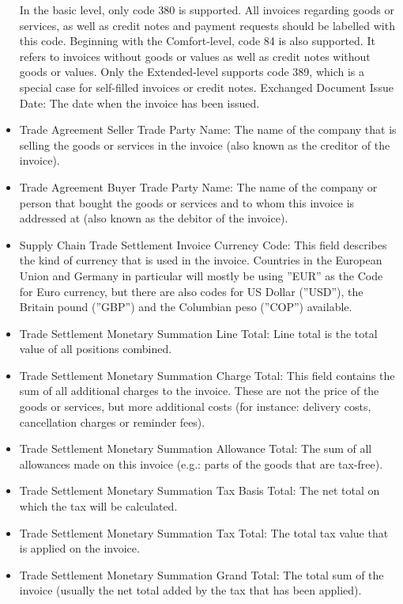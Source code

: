 \begin{itemize}
In the basic level, only code 380 is supported. All invoices regarding goods or services, as well as credit notes and payment requests should be labelled with this code.
Beginning with the Comfort-level, code 84 is also supported. It refers to invoices without goods or values as well as credit notes without goods or values.
Only the Extended-level supports code 389, which is a special case for self-filled invoices or credit notes.
Exchanged Document Issue Date: The date when the invoice has been issued.
	\item Trade Agreement Seller Trade Party Name: The name of the company that is selling the goods or services in the invoice (also known as the creditor of the invoice).
	\item Trade Agreement Buyer Trade Party Name: The name of the company or person that bought the goods or services and to whom this invoice is addressed at (also known as the debitor of the invoice).
	\item Supply Chain Trade Settlement Invoice Currency Code: This field describes the kind of currency that is used in the invoice. Countries in the European Union and Germany in particular will mostly be using ''EUR'' as the Code for Euro currency, but there are also codes for US Dollar (''USD''), the Britain pound (''GBP'') and the Columbian peso (''COP'') available.
	\item Trade Settlement Monetary Summation Line Total: Line total is the total value of all positions combined.
	\item Trade Settlement Monetary Summation Charge Total: This field contains the sum of all additional charges to the invoice. These are not the price of the goods or services, but more additional costs (for instance: delivery costs, cancellation charges or reminder fees).
	\item Trade Settlement Monetary Summation Allowance Total: The sum of all allowances made on this invoice (e.g.: parts of the goods that are tax-free).
	\item Trade Settlement Monetary Summation Tax Basis Total: The net total on which the tax will be calculated.
	\item Trade Settlement Monetary Summation Tax Total: The total tax value that is applied on the invoice.
	\item Trade Settlement Monetary Summation Grand Total: The total sum of the invoice (usually the net total added by the tax that has been applied).
\end{itemize}

